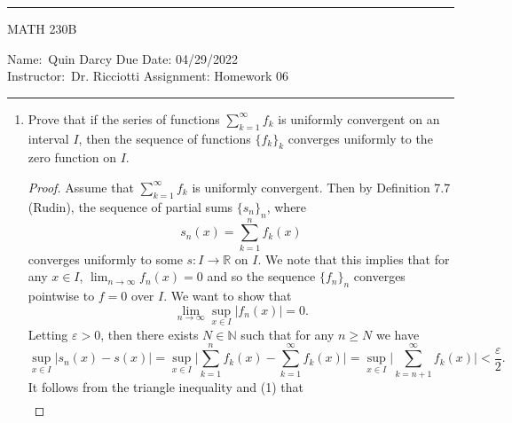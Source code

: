 \documentclass[12pt]{article}
\begin{document}
    \thispagestyle{empty}\hrule

    \begin{center}
        \vspace{.4cm} { \large MATH 230B}
    \end{center}
    {Name:\ Quin Darcy \hspace{\fill} Due Date: 04/29/2022   \\
    { Instructor:}\ Dr. Ricciotti \hspace{\fill} Assignment:
    Homework 06 \\ \hrule}

    \begin{enumerate}
        \item Prove that if the series of functions
            $\displaystyle\sum\limits_{k=1}^{\infty}f_k$ is uniformly
            convergent on an interval $I$, then the sequence of functions
            $\{f_k\}_k$ converges uniformly to the zero function on $I$. 
            \begin{proof}
                Assume that $\sum_{k=1}^{\infty}f_k$ is uniformly convergent.
                Then by Definition 7.7 (Rudin), the sequence of partial 
                sums $\{s_n\}_n$, where 
                \begin{equation*}
                    s_n(x)=\sum_{k=1}^{n}f_k(x)
                \end{equation*}
                converges uniformly to some $s:I\to\mathbb{R}$ on $I$. 
                We note that this implies that for any $x\in I$,
                $\lim_{n\to\infty}f_n(x)=0$ and so the sequence $\{f_n\}_n$
                converges pointwise to $f=0$ over $I$. We want to show that 
                \begin{equation*}
                    \lim_{n\to\infty}\sup_{x\in I}|f_n(x)|=0.
                \end{equation*}
                Letting $\varepsilon>0$, then there exists $N\in\mathbb{N}$
                such that for any $n\geq N$ we have 
                \begin{equation}
                    \sup_{x\in I}|s_n(x)-s(x)|=\sup_{x\in
                    I}\bigg|\sum_{k=1}^{n}f_k(x)-\sum_{k=1}^{\infty}f_k(x)\bigg|
                    =\sup_{x\in I}
                    \bigg|\sum_{k=n+1}^{\infty}f_k(x)\bigg|<\frac{\varepsilon}{2}.
                \end{equation}
                It follows from the triangle inequality and (1) that 
                \begin{align*}

\end{align*}
\end{proof}
\end{enumerate}
\end{document}
